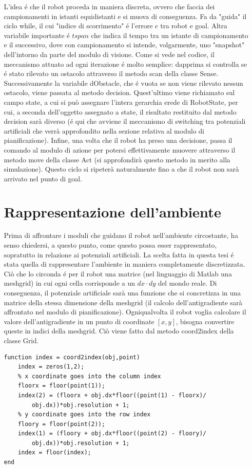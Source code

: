 \documentclass[14pt,a4paper]{extarticle}
\begin{document}
L'idea é che il robot proceda in maniera discreta, ovvero che faccia dei campionamenti in istanti equidistanti e si muova di conseguenza. Fa da "guida" il ciclo while, il cui "indice di scorrimento" é l'errore \(e\) tra robot e goal. Altra variabile importante é \(tspan\) che indica il tempo tra un istante di campionamento e il successivo, dove con campionamento si intende, volgarmente, uno "snapshot" dell'intorno da parte del modulo di visione. Come si vede nel codice, il meccanismo attuato ad ogni iterazione é molto semplice: dapprima si controlla se é stato rilevato un ostacolo attraverso il metodo scan della classe Sense. Successivamente la variabile dObstacle, che é vuota se non viene rilevato nessun ostacolo, viene passata al metodo decision. Quest'ultimo viene richiamato sul campo state, a cui si può assegnare l'intera gerarchia erede di RobotState, per cui, a seconda dell'oggetto assegnato a state, il risultato restituito dal metodo decision sarà diverso (é qui che avviene il meccanismo di switching tra potenziali artificiali che verrà approfondito nella sezione relativa al modulo di pianificazione). Infine, una volta che il robot ha preso una decisione, passa il comando al modulo di azione per potersi effettivamente muovere attraverso il metodo move della classe Act (si approfondirà questo metodo in merito alla simulazione). Questo ciclo si ripeterà naturalmente fino a che il robot non sarà arrivato nel punto di goal.

\section{Rappresentazione dell'ambiente}
Prima di affrontare i moduli che guidano il robot nell'ambiente circostante, ha senso chiedersi, a questo punto, come questo possa esser rappresentato, sopratutto in relazione ai potenziali artificiali. La scelta fatta in questa tesi é stata quella di rappresentare l'ambiente in maniera completamente discretizzata. Ciò che lo circonda é per il robot una matrice (nel linguaggio di Matlab una meshgrid) in cui ogni cella corrisponde a un \(dx\cdot dy\) del mondo reale. Di conseguenza, il potenziale artificiale sarà una funzione che si concretizza in una matrice della stessa dimensione della meshgrid (il calcolo dell'antigradiente sarà affrontato nel modulo di pianificazione). Ogniqualvolta il robot voglia calcolare il valore dell'antigradiente in un punto di coordinate \([x,y]\), bisogna convertire queste in indici della meshgrid. Ciò viene fatto dal metodo coord2index della classe Grid.
\begin{lstlisting}
function index = coord2index(obj,point)
	index = zeros(1,2);
	% x coordinate goes into the column index
	floorx = floor(point(1));
	index(2) = (floorx + obj.dx*floor((point(1) - floorx)/
		obj.dx))*obj.resolution + 1;
	% y coordinate goes into the row index
	floory = floor(point(2));
	index(1) = (floory + obj.dx*floor((point(2) - floory)/
		obj.dx))*obj.resolution + 1;
	index = floor(index);
end
\end{lstlisting}
\end{document}
